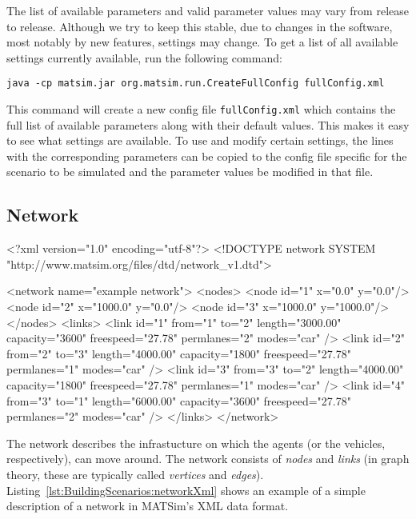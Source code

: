 The list of available parameters and valid parameter values may vary from
release to release. Although we try to keep this stable, due to changes in the
software, most notably by new features, settings may change. To get a list of
all available settings currently available, run the following command:
\begin{lstlisting}
java -cp matsim.jar org.matsim.run.CreateFullConfig fullConfig.xml
\end{lstlisting}
This command will create a new config file {\tt fullConfig.xml} which contains
the full list of available parameters along with their default values. This
makes it easy to see what settings are available. To use and modify certain
settings, the lines with the corresponding parameters can be copied to the
config file specific for the scenario to be simulated and the parameter values
be modified in that file.


\subsection{Network}

\begin{xml-file}[caption=An example of a network.xml,
label=lst:BuildingScenarios:networkXml]
<?xml version="1.0" encoding="utf-8"?>
<!DOCTYPE network SYSTEM "http://www.matsim.org/files/dtd/network_v1.dtd">

<network name="example network">
	<nodes>
		<node id="1" x="0.0" y="0.0"/>
		<node id="2" x="1000.0" y="0.0"/>
		<node id="3" x="1000.0" y="1000.0"/>
	</nodes>
	<links>
		<link id="1" from="1" to="2" length="3000.00" capacity="3600" 
		                           freespeed="27.78" permlanes="2" modes="car" />
		<link id="2" from="2" to="3" length="4000.00" capacity="1800" 
		                           freespeed="27.78" permlanes="1" modes="car" />
		<link id="3" from="3" to="2" length="4000.00" capacity="1800" 
		                           freespeed="27.78" permlanes="1" modes="car" />
		<link id="4" from="3" to="1" length="6000.00" capacity="3600" 
		                           freespeed="27.78" permlanes="2" modes="car" />
	</links>
</network>
\end{xml-file}

The network describes the infrastucture on which the agents (or the vehicles,
respectively), can move around. The network consists of \emph{nodes} and
\emph{links} (in graph theory, these are typically called \emph{vertices} and
\emph{edges}). Listing~\ref{lst:BuildingScenarios:networkXml} shows an example
of a simple description of a network in MATSim's XML data format.

